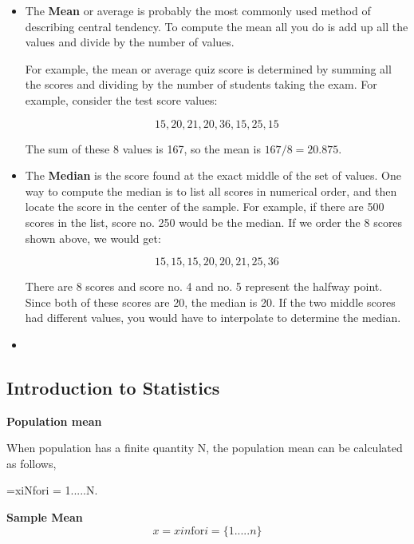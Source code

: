 \documentclass[]{report}
\begin{document}
\begin{itemize}

\item The \textbf{Mean} or average is probably the most commonly used method of describing central 
tendency. To compute the mean all you do is add up all the values and divide by the number of values.

For example, the mean or average quiz score is determined by summing all the scores and dividing by the number of students taking the exam. For example, consider the test score values:

\[15, 20, 21, 20, 36, 15, 25, 15\]

The sum of these 8 values is 167, so the mean is $167/8 = 20.875$.

\item The \textbf{Median} is the score found at the exact middle of the set of values. One way to compute the median is to list all scores in numerical order, and then locate the score in the center of the sample. For example, if there are 500 scores in the list, score no. 250 would be the median. If we order the 8 scores shown above, we would get:

\[15,15,15,20,20,21,25,36\]

There are 8 scores and score no. 4 and no. 5 represent the halfway point. Since both of these scores are 20, the median is 20. If the two middle scores had different values, you would have to interpolate to determine the median.


\item 
\end{itemize}









\subsection{Introduction to Statistics}

\textbf{Population mean}


When population has a finite quantity N, the population mean can be calculated as follows,

=xiNfori = 1.....N.




\textbf{Sample Mean}
\[x=xin    \mbox{for} i = \{1.....n\} \] 


\end{document}
